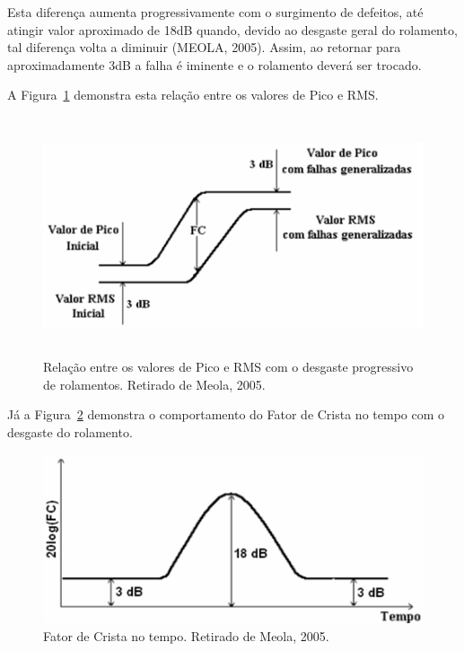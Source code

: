 \documentclass[
	12pt,				
	oneside,			
	a4paper,			
	english,			
	brazil,			
	]{abntex2ppgsi}
\begin{document}

Esta diferença aumenta progressivamente com o surgimento de defeitos, até atingir valor aproximado de 18dB quando, devido ao desgaste geral do rolamento, tal diferença volta a diminuir (MEOLA, 2005). Assim, ao retornar para aproximadamente 3dB a falha é iminente e o rolamento deverá ser trocado. 

A Figura~\ref{RelacaoPicoaPicoeRMS} demonstra esta relação entre os valores de Pico e RMS.  

\begin{figure}[!htb]
\centering
\includegraphics[width=\textwidth,height=70mm,keepaspectratio]{Figura18}
\caption {Relação entre os valores de Pico e RMS com o desgaste progressivo de rolamentos. Retirado de Meola, 2005.}
\label{RelacaoPicoaPicoeRMS}
\end{figure}	

Já a Figura~\ref{FatorCrista} demonstra o comportamento do Fator de Crista no tempo com o desgaste do rolamento.

\begin{figure}[!htb]
\centering
\includegraphics[width=\textwidth,height=50mm,keepaspectratio]{Figura19}
\caption {Fator de Crista no tempo. Retirado de Meola, 2005.}
\label{FatorCrista}
\end{figure}	
\end{document}
